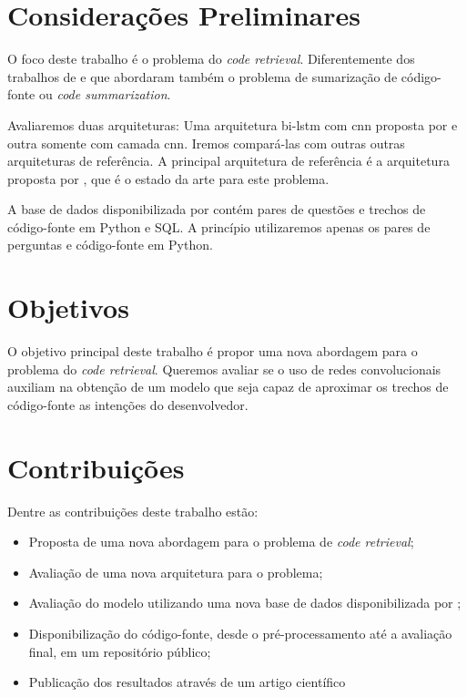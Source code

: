 \section{Considerações Preliminares}
\label{sec:consideracoes_preliminares}

O foco deste trabalho é o problema do \textit{code retrieval}. Diferentemente dos trabalhos de \cite{iyer-etal-2016-summarizing} e \cite{Allamanis-bimodal-source-code-natural-language:2015} que abordaram também o problema de sumarização de código-fonte ou \textit{code summarization}. 

Avaliaremos duas arquiteturas: Uma arquitetura bi-\acrshort{lstm} com \acrshort{cnn} proposta por \cite{tan-lstm-qa} e outra somente com camada \acrshort{cnn}. Iremos compará-las com outras outras arquiteturas de referência. A principal arquitetura de referência é a arquitetura proposta por \cite{cambronero-deep-learning-code-search:2019}, que é o estado da arte para este problema.

A base de dados disponibilizada por \cite{yao-2018} contém pares de questões e trechos de código-fonte em Python e SQL. A princípio utilizaremos apenas os pares de perguntas e código-fonte em Python.


\section{Objetivos}
\label{sec:objetivo}

O objetivo principal deste trabalho é propor uma nova abordagem para o problema do \textit{code retrieval}. Queremos avaliar se o uso de redes convolucionais auxiliam na obtenção de um modelo que seja capaz de aproximar os trechos de código-fonte as intenções do desenvolvedor.

\section{Contribuições}
\label{sec:contribucoes}

Dentre as contribuições deste trabalho estão:

\begin{itemize}
\item Proposta de uma nova abordagem para o problema de \textit{code retrieval};
\item Avaliação de uma nova arquitetura para o problema;
\item Avaliação do modelo utilizando uma nova base de dados disponibilizada por \cite{yao-2018};
\item Disponibilização do código-fonte, desde o pré-processamento até a avaliação final, em um repositório público;
\item Publicação dos resultados através de um artigo científico
\end{itemize}

